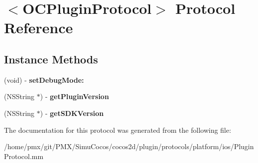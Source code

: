 \hypertarget{protocolOCPluginProtocol-p}{}\section{$<$O\+C\+Plugin\+Protocol$>$ Protocol Reference}
\label{protocolOCPluginProtocol-p}
\subsection*{Instance Methods}
\begin{DoxyCompactItemize}
\item 
\mbox{\label{protocolOCPluginProtocol-p_ad409f51f6df0eb0b2d3c4f257864f222}} 
(void) -\/ {\bfseries set\+Debug\+Mode\+:}
\item 
\mbox{\label{protocolOCPluginProtocol-p_af423e93e75462be742f9b0724e0b5957}} 
(N\+S\+String $\ast$) -\/ {\bfseries get\+Plugin\+Version}
\item 
\mbox{\label{protocolOCPluginProtocol-p_aad6069fb5c6d5d195cc27da2ef0fe35b}} 
(N\+S\+String $\ast$) -\/ {\bfseries get\+S\+D\+K\+Version}
\end{DoxyCompactItemize}


The documentation for this protocol was generated from the following file\+:\begin{DoxyCompactItemize}
\item 
/home/pmx/git/\+P\+M\+X/\+Simu\+Cocos/cocos2d/plugin/protocols/platform/ios/Plugin\+Protocol.\+mm\end{DoxyCompactItemize}
